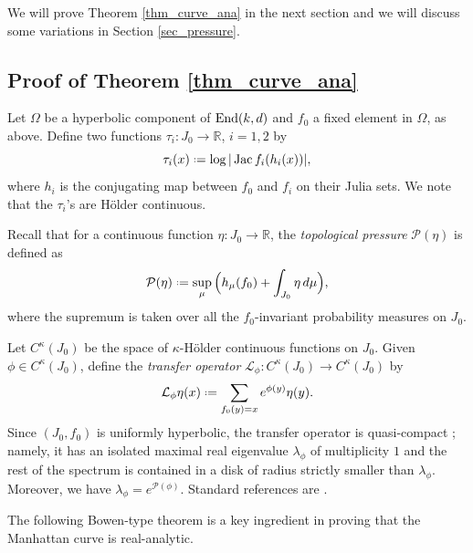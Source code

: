 \documentclass[11pt]{amsart}
\theoremstyle{plain}
\theoremstyle{definition}
\theoremstyle{remark}
\newcommand*{\defeq}{\mathrel{\vcenter{\baselineskip0.5ex \lineskiplimit0pt
			\hbox{\scriptsize.}\hbox{\scriptsize.}}}%
	=}
\DeclareMathOperator{\Jac}{Jac}
\begin{document}
We will prove Theorem \ref{thm_curve_ana} in the next section and 
we will discuss some variations in Section
\ref{sec_pressure}.


\subsection{Proof of Theorem \ref{thm_curve_ana}}\label{sec_pf} 
Let $\Omega$ be a hyperbolic component of ${\rm End}(k,d)$ and $f_0$ a fixed element in $\Omega$, as above. 
Define two functions $\tau_i \colon J_0 \to \mathbb{R}$, $i=1,2$
by
$$\tau_i(x) \defeq \log |\Jac f_i(h_i(x))|,$$
where $h_i$ is
the conjugating map between $f_0$ and $f_i$ 
on their Julia sets.
We note that the $\tau_i$'s
are H\"older continuous.

Recall that for a continuous function $\eta \colon J_0 \to \mathbb{R}$, the {\it topological pressure} $\mathcal{P}(\eta)$ is defined as
$$\mathcal{P}(\eta) \defeq \sup_{\mu} \Big(
h_\mu(f_0)+\int_{J_0}\eta\, d\mu\Big),$$
where the supremum is taken over all the $f_0$-invariant probability measures on $J_0$.

Let 
$C^\kappa(J_0)$ be the space of $\kappa$-H\"older continuous functions on $J_0$. Given $\phi \in C^\kappa(J_0)$, define the {\it transfer operator} $\mathcal{L}_\phi \colon C^\kappa(J_0) \to C^\kappa(J_0)$ by
$$\mathcal{L}_\phi\eta(x) \defeq \sum_{f_0(y)=x}e^{\phi(y)}\eta(y).$$
Since $(J_0,f_0)$ is uniformly hyperbolic, the transfer operator is quasi-compact
\cite{LyubichY-introduction}; 
namely, it has an isolated maximal
real eigenvalue $\lambda_\phi$
of multiplicity $1$
and the rest of the spectrum is contained in a disk of radius strictly smaller than $\lambda_\phi$. Moreover, we have $\lambda_\phi = e^{\mathcal{P}(\phi)}$. Standard references are \cite{Parry90, Ruellebook,PU}.

\medskip

The following Bowen-type theorem is a key ingredient in proving that the Manhattan curve is real-analytic.
\end{document}
